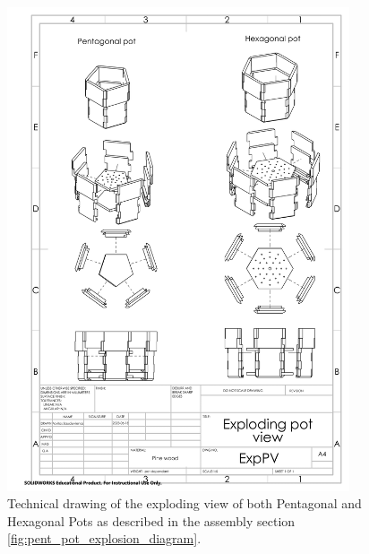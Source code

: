 \documentclass[12pt]{extarticle} %
\begin{document}
\begin{figure}[ht]
    \centering
    \includegraphics[width=0.9\textwidth]{images/technical_drawings/entire_exploding_technical_drawing.png}
    \caption{Technical drawing of the exploding view of both Pentagonal and Hexagonal Pots as described in the assembly section \ref{fig:pent_pot_explosion_diagram}.}
    \label{technical_drawing:entire_exploding_technical_drawing}
\end{figure}
\end{document}
